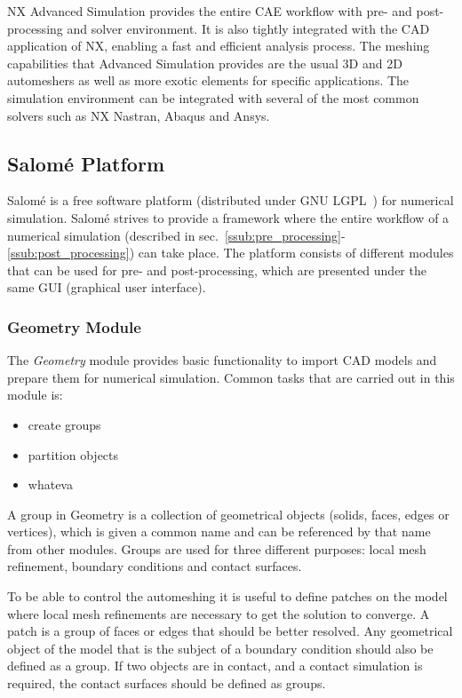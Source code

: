 NX Advanced Simulation provides the entire CAE workflow with pre- and post-processing and solver environment. It is also tightly integrated with the CAD application of NX, enabling a fast and efficient analysis process. The meshing capabilities that Advanced Simulation provides are the usual 3D and 2D automeshers as well as more exotic elements for specific applications. The simulation environment can be integrated with several of the most common solvers such as NX Nastran, Abaqus and Ansys.

\subsection{Salomé Platform} %
\label{sub:salom_platform}
Salomé is a free software platform (distributed under GNU LGPL~\cite{lgpl}) for numerical simulation. Salomé strives to provide a framework where the entire workflow of a numerical simulation (described in sec.~\ref{ssub:pre_processing}-\ref{ssub:post_processing}) can take place. The platform consists of different modules that can be used for pre- and post-processing, which are presented under the same GUI (graphical user interface).~\cite{ribes07} 

\subsubsection{Geometry Module} %
\label{ssub:geometry_module}
The \textit{Geometry} module provides basic functionality to import CAD models and prepare them for numerical simulation. Common tasks that are carried out in this module is:
\begin{itemize}
 	\item create groups
 	\item partition objects
 	\item whateva
\end{itemize}

A group in Geometry is a collection of geometrical objects (solids, faces, edges or vertices), which is given a common name and can be referenced by that name from other modules. Groups are used for three different purposes: local mesh refinement, boundary conditions and contact surfaces.

To be able to control the automeshing it is useful to define patches on the model where local mesh refinements are necessary to get the solution to converge. A patch is a group of faces or edges that should be better resolved. Any geometrical object of the model that is the subject of a boundary condition should also be defined as a group. If two objects are in contact, and a contact simulation is required, the contact surfaces should be defined as groups.

